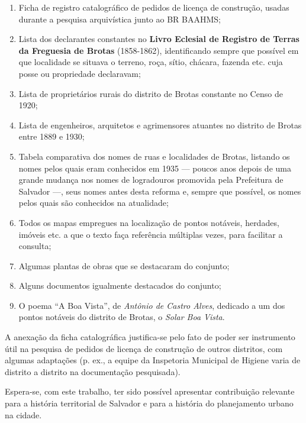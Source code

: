 \begin{enumerate}
\item Ficha de registro catalográfico de pedidos de licença de construção, usadas durante a pesquisa arquivística junto ao BR BAAHMS;
\item Lista dos declarantes constantes no \textbf{Livro Eclesial de Registro de Terras da Freguesia de Brotas} (1858-1862), identificando sempre que possível em que localidade se situava o terreno, roça, sítio, chácara, fazenda etc. cuja posse ou propriedade declaravam;
\item Lista de proprietários rurais do distrito de Brotas constante no Censo de 1920;
\item Lista de engenheiros, arquitetos e agrimensores atuantes no distrito de Brotas entre 1889 e 1930;
\item Tabela comparativa dos nomes de ruas e localidades de Brotas, listando os nomes pelos quais eram conhecidos em 1935 --- poucos anos depois de uma grande mudança nos nomes de logradouros promovida pela Prefeitura de Salvador \cite{souza_guia_1935} ---, seus nomes antes desta reforma e, sempre que possível, os nomes pelos quais são conhecidos na atualidade;
\item Todos os mapas empregues na localização de pontos notáveis, herdades, imóveis etc. a que o texto faça referência múltiplas vezes, para facilitar a consulta;
\item Algumas plantas de obras que se destacaram do conjunto;
\item Alguns documentos igualmente destacados do conjunto;
\item O poema ``A Boa Vista'', de \textit{Antônio de Castro Alves}, dedicado a um dos pontos notáveis do distrito de Brotas, o \textit{Solar Boa Vista}.
\end{enumerate}

A anexação da ficha catalográfica justifica-se pelo fato de poder ser instrumento útil na pesquisa de pedidos de licença de construção de outros distritos, com algumas adaptações (p. ex., a equipe da Inspetoria Municipal de Higiene varia de distrito a distrito na documentação pesquisada).

Espera-se, com este trabalho, ter sido possível apresentar contribuição relevante para a história territorial de Salvador e para a história do planejamento urbano na cidade.